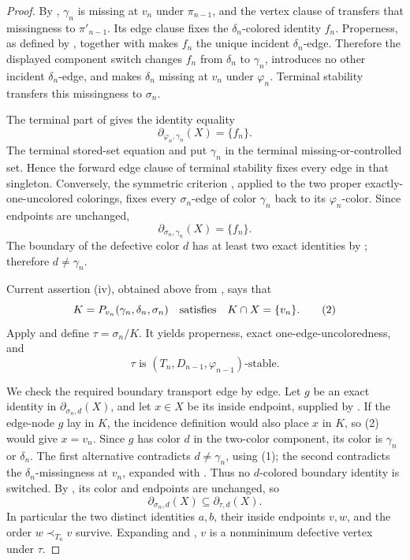 \begin{proof}
By , \(\gamma_n\) is missing at \(v_n\)
under \(\pi_{n-1}\), and the vertex clause of 
transfers that missingness to \(\pi'_{n-1}\). Its edge clause fixes the
\(\delta_n\)-colored identity \(f_n\). Properness, as defined by
, together with 
makes \(f_n\) the unique incident
\(\delta_n\)-edge. Therefore the displayed component switch changes
\(f_n\) from \(\delta_n\) to \(\gamma_n\), introduces no other incident
\(\delta_n\)-edge, and makes \(\delta_n\) missing at \(v_n\) under
\(\varphi_n\). Terminal stability transfers this missingness to
\(\sigma_n\).

The terminal part of  gives the
identity equality
\[
                 \partial_{\varphi_n,\gamma_n}(X)=\{f_n\}.
\]
The terminal stored-set equation and
 put \(\gamma_n\) in the terminal
missing-or-controlled set. Hence the forward edge clause of terminal
stability fixes every edge in that singleton. Conversely, the symmetric
criterion , applied to the two proper exactly-one-uncolored
colorings, fixes every \(\sigma_n\)-edge of color \(\gamma_n\) back to
its \(\varphi_n\)-color. Since endpoints are unchanged,
\[
                 \partial_{\sigma_n,\gamma_n}(X)=\{f_n\}.       \tag{1}
\]
The boundary of the defective color \(d\) has at least two exact
identities by ; therefore \(d\ne\gamma_n\).

Current assertion (iv), obtained above from ,
says that
\[
 K=P_{v_n}(\gamma_n,\delta_n,\sigma_n)
 \quad\hbox{satisfies}\quad K\cap X=\{v_n\}.                    \tag{2}
\]
Apply  and define
\(\tau=\sigma_n/K\). It yields properness, exact one-edge-uncoloredness,
and
\[
       \tau\text{ is }(T_n,D_{n-1},\varphi_{n-1})\text{-stable}. \tag{3}
\]

We check the required boundary transport edge by edge. Let \(g\) be an
exact identity in \(\partial_{\sigma_n,d}(X)\), and let \(x\in X\) be
its inside endpoint, supplied by . If the
edge-node \(g\) lay in \(K\), the incidence definition
 would also place \(x\) in \(K\), so (2)
would give \(x=v_n\). Since \(g\) has color \(d\) in the two-color
component, its color is \(\gamma_n\) or \(\delta_n\). The first
alternative contradicts \(d\ne\gamma_n\), using (1); the second
contradicts the \(\delta_n\)-missingness at \(v_n\), expanded with
. Thus no \(d\)-colored boundary identity is
switched. By , its color and endpoints
are unchanged, so
\[
 \partial_{\sigma_n,d}(X)\subseteq\partial_{\tau,d}(X).         \tag{4}
\]
In particular the two distinct identities \(a,b\), their inside
endpoints \(v,w\), and the order \(w\prec_{T_n}v\) survive. Expanding
 and , \(v\) is a
nonminimum defective vertex under \(\tau\).


\end{proof}
